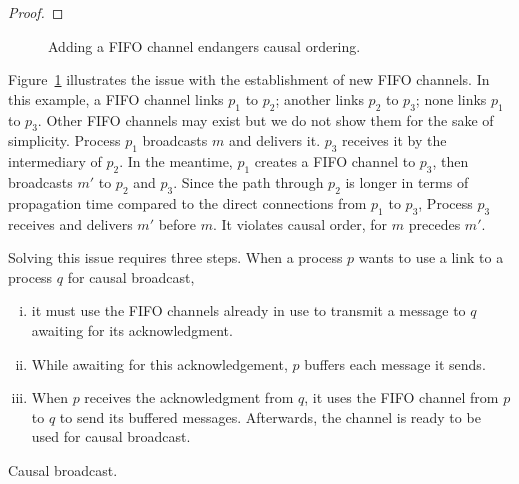 \begin{theorem}
\end{theorem}

\begin{proof}
\end{proof}

\begin{figure}
  \begin{center}
    
    \caption{\label{fig:problem}Adding a FIFO channel endangers causal
      ordering.}
  \end{center}
\end{figure}

Figure~\ref{fig:problem} illustrates the issue with the establishment of new
FIFO channels. In this example, a FIFO channel links $p_1$ to $p_2$; another
links $p_2$ to $p_3$; none links $p_1$ to $p_3$. Other FIFO channels may exist
but we do not show them for the sake of simplicity. Process $p_1$ broadcasts $m$
and delivers it. $p_3$ receives it by the intermediary of $p_2$. In the
meantime, $p_1$ creates a FIFO channel to $p_3$, then broadcasts $m'$ to $p_2$
and $p_3$. Since the path through $p_2$ is longer in terms of propagation time
compared to the direct connections from $p_1$ to $p_3$, Process $p_3$ receives
and delivers $m'$ before $m$. It violates causal order, for $m$ precedes $m'$.


Solving this issue requires three steps. When a process $p$ wants to use a link to
a process $q$ for causal broadcast,
\begin{enumerate}[(i)]
\item it must use the FIFO channels already in use to transmit a message to $q$
  awaiting for its acknowledgment.
\item While awaiting for this acknowledgement, $p$ buffers each message it
  sends.
\item When $p$ receives the acknowledgment from $q$, it uses the FIFO channel
  from $p$ to $q$ to send its buffered messages. Afterwards, the channel is
  ready to be used for causal broadcast.
\end{enumerate}

\begin{algorithm*}[h]
  
  \caption{\label{algo:causalbroadcast}Causal broadcast.}
\end{algorithm*}


